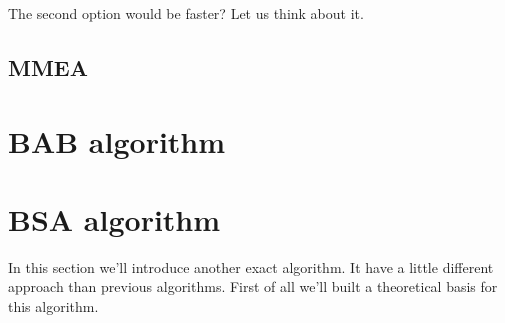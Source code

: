 The second option would be faster? Let us think about it.



\subsection{MMEA}

\section{BAB algorithm}  %
\section{BSA algorithm}
In this section we'll introduce another exact algorithm. It have a little different approach than previous algorithms. First of all we'll built a theoretical basis for this algorithm.






